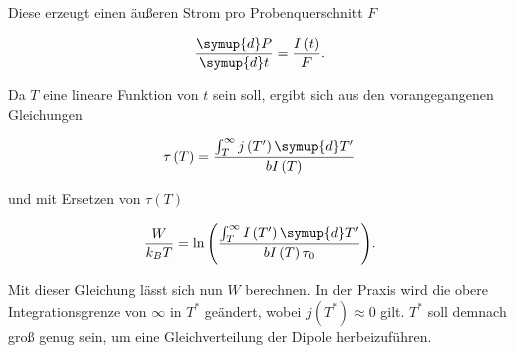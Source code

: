 Diese erzeugt einen äußeren Strom pro Probenquerschnitt $F$ 

\begin{equation*}
    \frac{\symup{d}P}{\symup{d}t} = \frac{I\left(t\right)}{F}.
\end{equation*}

Da $T$ eine lineare Funktion von $t$ sein soll, ergibt sich aus den vorangegangenen Gleichungen 

\begin{equation*}
    \tau\left(T\right) = \frac{\int_T^\infty j\left(T'\right)\symup{d}T'}{bI\left(T\right)}
\end{equation*}

und mit Ersetzen von $\tau\left(T\right)$

\begin{equation}
    \label{eqn:int}
    \frac{W}{k_B T} = \ln{\left(\frac{\int_T^\infty I\left(T'\right)\symup{d}T'}{bI\left(T\right)\tau_0}\right)}.
\end{equation}

Mit dieser Gleichung lässt sich nun $W$ berechnen. In der Praxis wird die obere Integrationsgrenze von $\infty$ in $T^*$ geändert, wobei
$j\left(T^*\right)\approx 0$ gilt. $T^*$ soll demnach groß genug sein, um eine Gleichverteilung der Dipole herbeizuführen. 